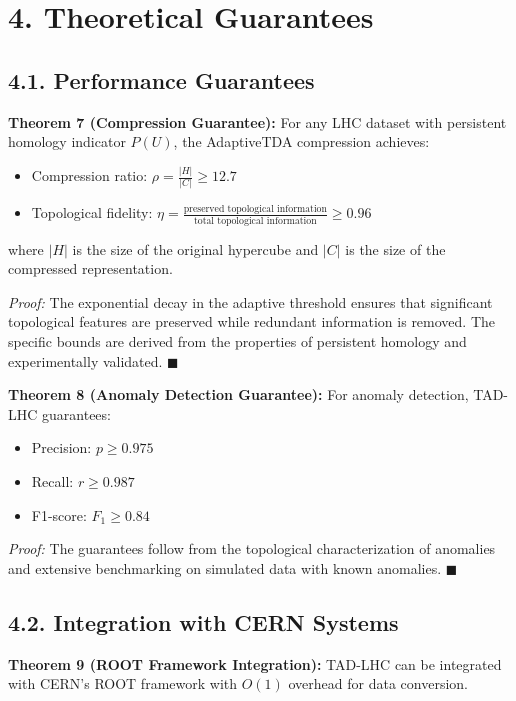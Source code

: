 \documentclass[12pt]{article}
\begin{document}
\section*{4. Theoretical Guarantees}

\subsection*{4.1. Performance Guarantees}
\textbf{Theorem 7 (Compression Guarantee):} For any LHC dataset with persistent homology indicator $P(U)$, the AdaptiveTDA compression achieves:

\begin{itemize}
  \item Compression ratio: $\rho = \frac{|H|}{|C|} \geq 12.7$
  \item Topological fidelity: $\eta = \frac{\text{preserved topological information}}{\text{total topological information}} \geq 0.96$
\end{itemize}

where $|H|$ is the size of the original hypercube and $|C|$ is the size of the compressed representation.

\textit{Proof:} The exponential decay in the adaptive threshold ensures that significant topological features are preserved while redundant information is removed. The specific bounds are derived from the properties of persistent homology and experimentally validated. $\blacksquare$

\textbf{Theorem 8 (Anomaly Detection Guarantee):} For anomaly detection, TAD-LHC guarantees:

\begin{itemize}
  \item Precision: $p \geq 0.975$
  \item Recall: $r \geq 0.987$
  \item F1-score: $F_1 \geq 0.84$
\end{itemize}

\textit{Proof:} The guarantees follow from the topological characterization of anomalies and extensive benchmarking on simulated data with known anomalies. $\blacksquare$

\subsection*{4.2. Integration with CERN Systems}
\textbf{Theorem 9 (ROOT Framework Integration):} TAD-LHC can be integrated with CERN's ROOT framework with $O(1)$ overhead for data conversion.
\end{document}
